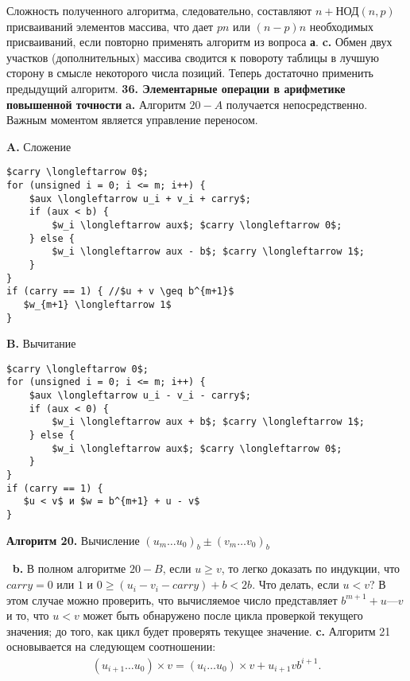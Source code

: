 \newpage
Сложность полученного алгоритма, следовательно, составляют $n + \text{НОД}(n,p)$ присваиваний элементов массива, что дает $pn$ или $(n - p)n$ необходимых присваиваний, если повторно применять алгоритм из во­проса \textbf{а}.
\newline \newline \indent
\textbf{c.} Обмен двух участков (дополнительных) массива сводится к по­вороту таблицы в лучшую сторону в смысле некоторого числа позиций. Теперь достаточно применить предыдущий алгоритм.
\newline \newline
\textbf{36. Элементарные операции в арифметике повышенной точности}
\newline \newline \indent
\textbf{a.} Алгоритм $20-A$ получается непосредственно. Важным моментом
является управление переносом.
\begin{multicols}{2}
\begin{center}
\textbf{A.} Сложение
\end{center}
{\begin{lstlisting}[mathescape=true]
$carry \longleftarrow 0$;
for (unsigned i = 0; i <= m; i++) {
    $aux \longleftarrow u_i + v_i + carry$;
    if (aux < b) {
        $w_i \longleftarrow aux$; $carry \longleftarrow 0$;   
    } else {
        $w_i \longleftarrow aux - b$; $carry \longleftarrow 1$;
    }
}
if (carry == 1) { //$u + v \geq b^{m+1}$
   $w_{m+1} \longleftarrow 1$
}
\end{lstlisting}}
\columnbreak
\begin{center}
\textbf{B.} Вычитание
\end{center}
{\begin{lstlisting}[mathescape=true]
$carry \longleftarrow 0$;
for (unsigned i = 0; i <= m; i++) {
    $aux \longleftarrow u_i - v_i - carry$;
    if (aux < 0) {
        $w_i \longleftarrow aux + b$; $carry \longleftarrow 1$;   
    } else {
        $w_i \longleftarrow aux$; $carry \longleftarrow 0$;
    }
}
if (carry == 1) {
   $u < v$ и $w = b^{m+1} + u - v$
}
\end{lstlisting}}
\end{multicols}
\begin{center}
\textbf{Алгоритм 20.} Вычисление $(u_m \dots u_0)_b \pm (v_m \dots v_0)_b$
\end{center}
$\:$ \newline
\textit{\indent}\textbf{b.} В полном алгоритме $20-B$, если $u \geq v$, то легко доказать по ин­дукции, что $carry = 0$ или $1$ и $0 \geq (u_i - v_i - carry) + b < 2b$.
\newline \indent Что делать, если $u < v$? В этом случае можно проверить, что вычисляемое число представляет $b^{m+1} + u — v$ и то, что $u < v$ может быть обнаружено после цикла проверкой текущего значения; до того, как цикл будет проверять текущее значение.
\newline \newline \indent
\textbf{c.} Алгоритм 21 основывается на следующем соотношении:
\begin{align*}
(u_{i+1} \dots u_0) \times v = (u_i \dots u_0) \times v + u_{i+1} v b^{i+1}.
\end{align*}
